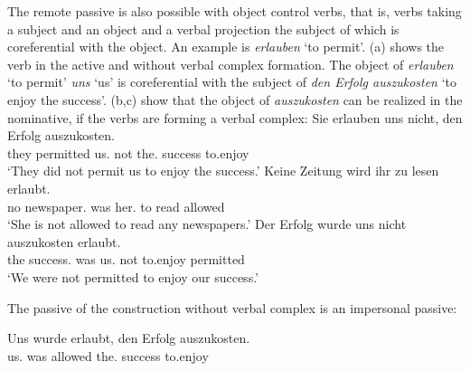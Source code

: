The remote passive is also possible with object control verbs, that is, verbs taking a subject and
an object and a verbal projection the subject of which is coreferential with the object. An example
is \emph{erlauben} `to permit'. (a) shows the verb in the active and without verbal complex
formation. The object of \emph{erlauben} `to permit' \emph{uns} `us' is coreferential with the
subject of \emph{den Erfolg auszukosten} `to enjoy the success'. (b,c) show that the object
of \emph{auszukosten} can be realized in the nominative, if the verbs are forming a verbal complex:
\eal
\label{bsp-auskosten-fernpassiv}
\ex 
\gll Sie erlauben uns nicht, den Erfolg auszukosten.\\
     they permitted us.\DAT{} not the.\ACC{} success to.enjoy\\
\glt `They did not permit us to enjoy the success.'
\ex{}
\gll Keine Zeitung          wird ihr       zu lesen erlaubt.\footnotemark\\
     no    newspaper.\NOM{} was  her.\DAT{} to read  allowed\\
\glt `She is not allowed to read any newspapers.'%
\ex{}
\gll Der Erfolg         wurde uns      nicht auszukosten erlaubt.\footnotemark\\
     the success.\NOM{} was   us.\DAT{} not   to.enjoy                  permitted\\
\glt `We were not permitted to enjoy our success.'%
\label{bsp-auskosten-fernpassiv-haider}
\zl

\noindent
The passive of the construction without verbal complex is an impersonal passive:

\ea
\gll Uns wurde erlaubt, den Erfolg auszukosten.\\
     us.\DAT{}  was   allowed  the.\ACC{} success to.enjoy\\
\z

